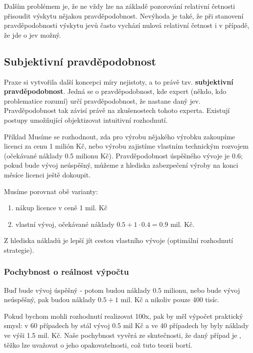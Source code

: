 	Dalším problémem je, že ne vždy lze na základě pozorování relativní četnosti přisoudit výskytu nějakou pravděpodobnost. Nevýhoda je také, že při stanovení pravděpodobnosti výskytu  jevů často vychází nulová relativní četnost i v případě, že jde o jev možný.

	\subsection{Subjektivní pravděpodobnost}
	Praxe si vytvořila další koncepci míry nejistoty, a to právě tzv. \textbf{subjektivní pravděpodobnost}. Jedná se o pravděpodobnost, kde expert (někdo, kdo problematice rozumí) určí pravděpodobnost, že nastane daný  jev. Pravděpodobnost tak závisí právě na zkušenostech tohoto experta. Existují postupy umožňující objektizovat intuitivní rozhodnutí.

	\begin{note}{Příklad}
		Musíme se rozhodnout, zda pro výrobu nějakého výrobku zakoupíme licenci za cenu 1 milión Kč, nebo výrobu zajistíme vlastním technickým rozvojem (očekávané náklady 0.5 milionu Kč). Pravděpodobnost úspěšného vývoje je 0.6; pokud bude vývoj neúspěšný, můžeme z hlediska zabezpečení výroby na konci měsíce licenci ještě dokoupit.\br

		Musíme porovnat obě varianty:
		\begin{enumerate}[label=\alph*), noitemsep]
			\item nákup licence v ceně 1 mil. Kč
			\item vlastní vývoj, očekávané náklady $0.5 + 1\cdot 0.4 = 0.9$ mil. Kč.
		\end{enumerate}

		Z hlediska nákladů je lepší jít cestou vlastního vývoje (optimální rozhodnutí strategie).

		\subsubsection*{Pochybnost o reálnost výpočtu}
		Buď bude vývoj úspěšný - potom budou náklady $0.5$ milionu, nebo bude vývoj neúspěšný, pak budou náklady $0.5+1$ mil. Kč a nikoliv pouze 400 tisíc.\br

		Pokud bychom mohli rozhodnutí realizovat 100x, pak by měl výpočet praktický smysl: v 60 případech by stál vývoj 0.5 mil Kč a ve 40 případech by byly náklady ve výši 1.5 mil. Kč. Naše pochybnost vyvěrá  ze skutečnosti, že daný případ je , těžko lze uvažovat o jeho opakovatelnosti, což tuto teorii bortí.\br
	\end{note}

